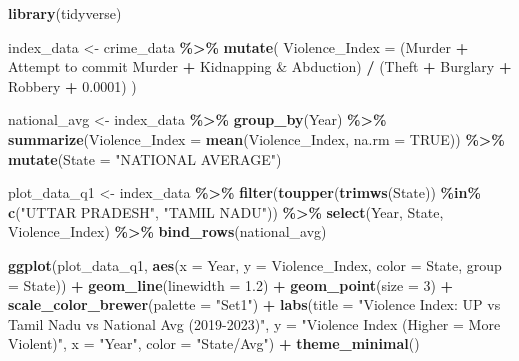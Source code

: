 \documentclass[
]{article}
\newenvironment{Shaded}{\begin{snugshade}}{\end{snugshade}}
\newcommand{\AttributeTok}[1]{\textcolor[rgb]{0.13,0.29,0.53}{#1}}
\newcommand{\ConstantTok}[1]{\textcolor[rgb]{0.56,0.35,0.01}{#1}}
\newcommand{\DecValTok}[1]{\textcolor[rgb]{0.00,0.00,0.81}{#1}}
\newcommand{\FloatTok}[1]{\textcolor[rgb]{0.00,0.00,0.81}{#1}}
\newcommand{\FunctionTok}[1]{\textcolor[rgb]{0.13,0.29,0.53}{\textbf{#1}}}
\newcommand{\NormalTok}[1]{#1}
\newcommand{\OtherTok}[1]{\textcolor[rgb]{0.56,0.35,0.01}{#1}}
\newcommand{\SpecialCharTok}[1]{\textcolor[rgb]{0.81,0.36,0.00}{\textbf{#1}}}
\newcommand{\StringTok}[1]{\textcolor[rgb]{0.31,0.60,0.02}{#1}}
\begin{document}
\begin{Shaded}
\begin{Highlighting}[]
\FunctionTok{library}\NormalTok{(tidyverse)}

\NormalTok{index\_data }\OtherTok{\textless{}{-}}\NormalTok{ crime\_data }\SpecialCharTok{\%\textgreater{}\%}
  \FunctionTok{mutate}\NormalTok{(}
    \AttributeTok{Violence\_Index =}\NormalTok{ (Murder }\SpecialCharTok{+} \StringTok{\textasciigrave{}}\AttributeTok{Attempt to commit Murder}\StringTok{\textasciigrave{}} \SpecialCharTok{+} \StringTok{\textasciigrave{}}\AttributeTok{Kidnapping \& Abduction}\StringTok{\textasciigrave{}}\NormalTok{) }\SpecialCharTok{/} 
\NormalTok{                     (Theft }\SpecialCharTok{+}\NormalTok{ Burglary }\SpecialCharTok{+}\NormalTok{ Robbery }\SpecialCharTok{+} \FloatTok{0.0001}\NormalTok{)}
\NormalTok{  )}

\NormalTok{national\_avg }\OtherTok{\textless{}{-}}\NormalTok{ index\_data }\SpecialCharTok{\%\textgreater{}\%}
  \FunctionTok{group\_by}\NormalTok{(Year) }\SpecialCharTok{\%\textgreater{}\%}
  \FunctionTok{summarize}\NormalTok{(}\AttributeTok{Violence\_Index =} \FunctionTok{mean}\NormalTok{(Violence\_Index, }\AttributeTok{na.rm =} \ConstantTok{TRUE}\NormalTok{)) }\SpecialCharTok{\%\textgreater{}\%}
  \FunctionTok{mutate}\NormalTok{(}\AttributeTok{State =} \StringTok{"NATIONAL AVERAGE"}\NormalTok{)}

\NormalTok{plot\_data\_q1 }\OtherTok{\textless{}{-}}\NormalTok{ index\_data }\SpecialCharTok{\%\textgreater{}\%}
  \FunctionTok{filter}\NormalTok{(}\FunctionTok{toupper}\NormalTok{(}\FunctionTok{trimws}\NormalTok{(State)) }\SpecialCharTok{\%in\%} \FunctionTok{c}\NormalTok{(}\StringTok{"UTTAR PRADESH"}\NormalTok{, }\StringTok{"TAMIL NADU"}\NormalTok{)) }\SpecialCharTok{\%\textgreater{}\%}
  \FunctionTok{select}\NormalTok{(Year, State, Violence\_Index) }\SpecialCharTok{\%\textgreater{}\%}
  \FunctionTok{bind\_rows}\NormalTok{(national\_avg)}

\FunctionTok{ggplot}\NormalTok{(plot\_data\_q1, }\FunctionTok{aes}\NormalTok{(}\AttributeTok{x =}\NormalTok{ Year, }\AttributeTok{y =}\NormalTok{ Violence\_Index, }\AttributeTok{color =}\NormalTok{ State, }\AttributeTok{group =}\NormalTok{ State)) }\SpecialCharTok{+}
  \FunctionTok{geom\_line}\NormalTok{(}\AttributeTok{linewidth =} \FloatTok{1.2}\NormalTok{) }\SpecialCharTok{+}
  \FunctionTok{geom\_point}\NormalTok{(}\AttributeTok{size =} \DecValTok{3}\NormalTok{) }\SpecialCharTok{+}
  \FunctionTok{scale\_color\_brewer}\NormalTok{(}\AttributeTok{palette =} \StringTok{"Set1"}\NormalTok{) }\SpecialCharTok{+}
  \FunctionTok{labs}\NormalTok{(}\AttributeTok{title =} \StringTok{"Violence Index: UP vs Tamil Nadu vs National Avg (2019{-}2023)"}\NormalTok{,}
       \AttributeTok{y =} \StringTok{"Violence Index (Higher = More Violent)"}\NormalTok{, }\AttributeTok{x =} \StringTok{"Year"}\NormalTok{, }\AttributeTok{color =} \StringTok{"State/Avg"}\NormalTok{) }\SpecialCharTok{+}
  \FunctionTok{theme\_minimal}\NormalTok{()}
\end{Highlighting}
\end{Shaded}
\end{document}
